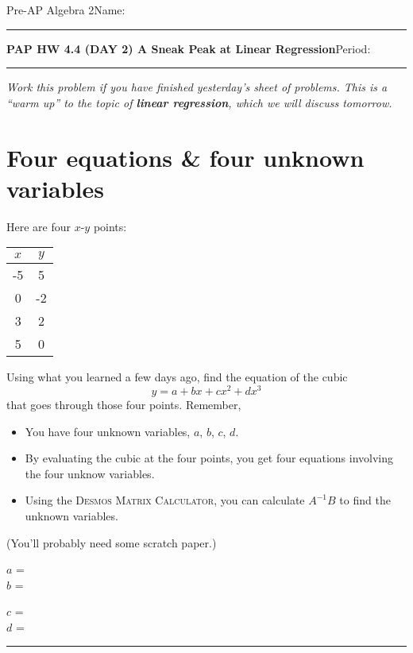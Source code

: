 \documentclass[10pt,letterpaper]{memoir}
\begin{document}
\pagestyle{plain}
\checkandfixthelayout
{}



{\small Pre-AP Algebra 2}\hfill Name: \rule{2in}{0.15mm}

{\bfseries\Large PAP HW 4.4 (DAY 2) A Sneak Peak at Linear Regression}\hfill Period: \rule{0.5in}{0.15mm}



\begin{tcolorbox}
    \itshape\small
    Work this problem if you have finished yesterday's sheet of problems.
    This is a ``warm up'' to the topic of 
    {\bfseries\itshape linear regression}, which we will discuss tomorrow.
\end{tcolorbox}




\section*{Four equations \& four unknown variables} 
Here are four $x$-$y$ points:
\begin{center}\begin{tabular}{cc}
    \toprule
    $x$ & $y$ \\
    \midrule
    -5 & 5 \\
    0 & -2 \\
    3 & 2 \\
    5 & 0 \\
    \bottomrule
\end{tabular}\end{center}
Using what you learned a few days ago,
find the equation of the cubic  
\[
    y = a + bx + cx^2 + dx^3
\]
that goes through
those four points.
Remember,
\begin{itemize}[itemsep=0in]
    \item You have four unknown variables, $a$, $b$, $c$, $d$.
    \item By evaluating the cubic at the four points, you get four equations
    involving the four unknow variables.
    \item Using the {\scshape Desmos Matrix Calculator}, 
    you can calculate $A^{-1}B$ to find the unknown variables.
\end{itemize}
(You'll probably need some scratch paper.)\vspace{1em}

\begin{minipage}{2in}
    {\Large
    $a$ = \gap{\hspace{1em}}\\[1em]
    $b$ = \gap{\hspace{1em}}\\
    }
\end{minipage}
\begin{minipage}{2in}
    {\Large
    $c$ = \gap{\hspace{1em}}\\[1em]
    $d$ = \gap{\hspace{1em}}\\
    }
\end{minipage}
\hrule
\end{document}
